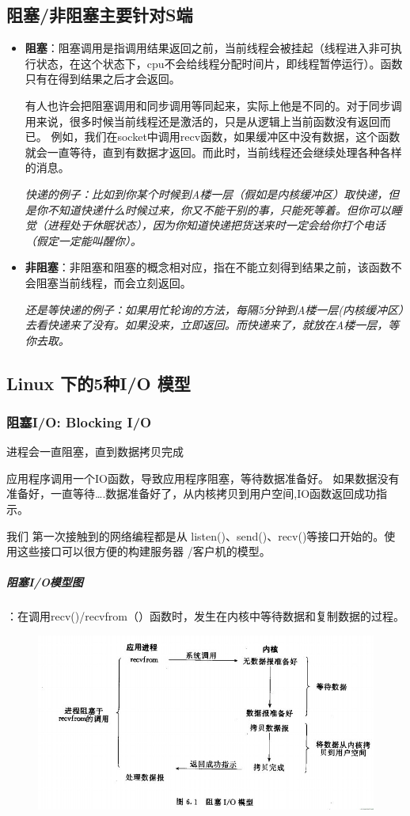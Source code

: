 \documentclass[UTF8,a4paper,8pt]{ctexbook}
\begin{document}
		\subsection{阻塞/非阻塞主要针对S端}
			\begin{itemize}
				\item \textbf{阻塞}：阻塞调用是指调用结果返回之前，当前线程会被挂起（线程进入非可执行状态，在这个状态下，cpu不会给线程分配时间片，即线程暂停运行）。函数只有在得到结果之后才会返回。
				
				有人也许会把阻塞调用和同步调用等同起来，实际上他是不同的。对于同步调用来说，很多时候当前线程还是激活的，只是从逻辑上当前函数没有返回而已。 例如，我们在socket中调用recv函数，如果缓冲区中没有数据，这个函数就会一直等待，直到有数据才返回。而此时，当前线程还会继续处理各种各样的消息。
				
				\textit{快递的例子：比如到你某个时候到A楼一层（假如是内核缓冲区）取快递，但是你不知道快递什么时候过来，你又不能干别的事，只能死等着。但你可以睡觉（进程处于休眠状态），因为你知道快递把货送来时一定会给你打个电话（假定一定能叫醒你）。}
				\item \textbf{非阻塞}：非阻塞和阻塞的概念相对应，指在不能立刻得到结果之前，该函数不会阻塞当前线程，而会立刻返回。
				
				\textit{还是等快递的例子：如果用忙轮询的方法，每隔5分钟到A楼一层(内核缓冲区）去看快递来了没有。如果没来，立即返回。而快递来了，就放在A楼一层，等你去取。}
			\end{itemize}
		\subsection{Linux 下的5种I/O 模型}
			\subsubsection{阻塞I/O: Blocking I/O}进程会一直阻塞，直到数据拷贝完成
			
			应用程序调用一个IO函数，导致应用程序阻塞，等待数据准备好。 如果数据没有准备好，一直等待….数据准备好了，从内核拷贝到用户空间,IO函数返回成功指示。
			
			我们 第一次接触到的网络编程都是从 listen()、send()、recv()等接口开始的。使用这些接口可以很方便的构建服务器 /客户机的模型。
			
			\subparagraph{阻塞I/O模型图}：在调用recv()/recvfrom（）函数时，发生在内核中等待数据和复制数据的过程。
			\begin{figure}[h]
				\centering
				\includegraphics[scale = 0.8]{BlockingIO.jpg}
			\end{figure}
			
\end{document}
